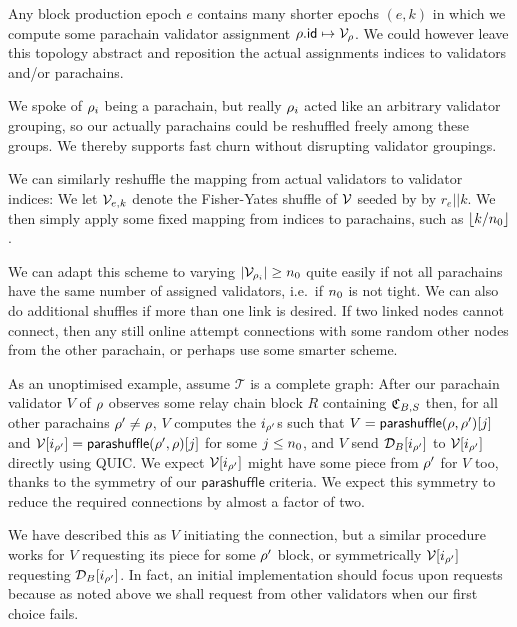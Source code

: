 Any block production epoch $e$ contains many shorter epochs $(e,k)$ in which we compute some parachain validator assignment $\rho.\mathsf{id} \mapsto \mathcal{V}_{\rho}$.  We could however leave this topology abstract and reposition the actual assignments indices to validators and/or parachains. 

We spoke of $\rho_i$ being a parachain, but really $\rho_i$ acted like an arbitrary validator grouping, so our actually parachains could be reshuffled freely among these groups.  We thereby supports fast churn without disrupting validator groupings.

We can similarly reshuffle the mapping from actual validators to validator indices: 
We let $\mathcal{V}_{e,k}$ denote the Fisher-Yates shuffle of $\mathcal{V}$ seeded by by $r_e || k$.  We then simply apply some fixed mapping from indices to parachains, such as $\left\lfloor k / n_0 \right\rfloor$.  


We can adapt this scheme to varying $|\mathcal{V}_{\rho_i}| \ge n_0$ quite easily if not all parachains have the same number of assigned validators, i.e.\ if $n_0$ is not tight.  We can also do additional shuffles if more than one link is desired.  
% 
If two linked nodes cannot connect, then any still online attempt connections with some random other nodes from the other parachain, or perhaps use some smarter scheme. 


As an unoptimised example, assume $\mathcal{T}$ is a complete graph:  After our parachain validator $V$ of $\rho$ observes some relay chain block $R$ containing $\mathfrak{C}_{B,S}$ then, for all other parachains $\rho' \ne \rho$, $V$ computes the $i_{\rho'}$s such that $V = \mathsf{parashuffle}(\rho,\rho')[j]$ and $\mathcal{V}[i_{\rho'}] = \mathsf{parashuffle}(\rho',\rho)[j]$ for some $j \leq n_0$, and $V$ send $\mathcal{D}_B[i_{\rho'}]$ to $\mathcal{V}[i_{\rho'}]$ directly using QUIC.  We expect $\mathcal{V}[i_{\rho'}]$ might have some piece from $\rho'$ for $V$ too, thanks to the symmetry of our $\mathsf{parashuffle}$ criteria.  We expect this symmetry to reduce the required connections by almost a factor of two.

We have described this as $V$ initiating the connection, but a similar procedure works for $V$ requesting its piece for some $\rho'$ block, or symmetrically $\mathcal{V}[i_{\rho'}]$ requesting $\mathcal{D}_B[i_{\rho'}]$.  In fact, an initial implementation should focus upon requests because as noted above we shall request from other validators when our first choice fails. 

